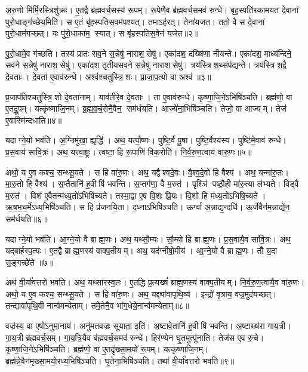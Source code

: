 अ॒रु॒णो मि॑र्मि॒रस्त्रिशु॑क्रः। ए॒तद्वै ब्र॑ह्मवर्च॒सस्य॑ रू॒पम्। रू॒पेणै॒व ब्र॑ह्मवर्च॒समव॑ रुन्धे। बृह॒स्पति॑रकामयत दे॒वानां पुरो॒धाङ्ग॑च्छेय॒मिति॑। स ए॒तं बृ॑हस्पतिस॒वम॑पश्यत्। तमाऽह॑रत्। तेना॑यजत। ततो॒ वै स दे॒वानां पुरो॒धाम॑गच्छत्। यः पु॑रो॒धाका॑म॒ स्यात्। स बृ॑हस्पतिस॒वेन॑ यजेत॥२॥

पु॒रो॒धामे॒व ग॑च्छति। तस्य॑ प्रातः सव॒ने स॒न्नेषु॑ नाराश॒सेषु॑। एका॑दश॒ दख्षि॑णा नीयन्ते। एका॑दश॒ माध्य॑न्दिने॒ सव॑ने स॒न्नेषु॑ नाराश॒सेषु॑। एका॑दश तृतीयसव॒ने स॒न्नेषु॑ नाराश॒सेषु॑। त्रय॑स्त्रिश॒थ्संप॑द्यन्ते। त्रय॑स्त्रिश॒द्वै दे॒वताः। दे॒वता॑ ए॒वाव॑रुन्धे। अश्व॑श्चतुस्त्रि॒शः। प्रा॒जा॒प॒त्यो वा अश्व॑॥३॥

प्र॒जाप॑तिश्चतुस्त्रि॒शो दे॒वता॑नाम्। याव॑तीरे॒व दे॒वताः। ता ए॒वाव॑रुन्धे। कृ॒ष्णा॒जि॒ने॑ऽभिषि॑ञ्चति। ब्रह्म॑णो॒ वा ए॒तद्रू॒पम्। यत्कृ॑ष्णाजि॒नम्। ब्र॒ह्म॒व॒र्च॒सेनै॒वैन॒ सम॑र्धयति। आज्ये॑ना॒भिषि॑ञ्चति। तेजो॒ वा आज्यम्। तेज॑ ए॒वास्मि॑न्दधाति॥४॥\anuvakamend[होता॑ भवति यजेत॒ वा अश्वो॑ दधाति]

यदाग्ने॒यो भव॑ति। अ॒ग्निमु॑खा॒ ह्यृद्धि॑। अथ॒ यत्पौ॒ष्णः। पुष्टि॒र्वै पू॒षा। पुष्टि॒र्वैश्य॑स्य। पुष्टि॑मे॒वाव॑ रुन्धे। प्र॒स॒वाय॑ सावि॒त्रः। अथ॒ यत्त्वा॒ष्ट्रः। त्वष्टा॒ हि रू॒पाणि॑ विक॒रोति॑। नि॒र्व॒रु॒ण॒त्वाय॑ वारु॒णः॥५॥

अथो॒ य ए॒व कश्च॒ सन्थ्सू॒यते। स हि वा॑रु॒णः। अथ॒ यद्वैश्वदे॒वः। वै॒श्व॒दे॒वो हि वैश्य॑। अथ॒ यन्मा॑रु॒तः। मा॒रु॒तो हि वैश्य॑। स॒प्तैतानि॑ ह॒वीषि॑ भवन्ति। स॒प्तग॑णा॒ वै म॒रुत॑। पृश्ञि॑ पष्ठौ॒ही मा॑रु॒त्या ल॑भ्यते। विड्वै म॒रुत॑। विश॑ ए॒वैतन्म॑ध्य॒तो॑ऽभिषि॑च्यते। तस्मा॒द्वा ए॒ष वि॒शः प्रि॒यः। वि॒शो हि म॑ध्य॒तो॑ऽभिषि॒च्यते। ऋ॒ष॒भ॒च॒र्मेऽध्य॒भिषि॑ञ्चति। स हि प्र॑जनयि॒ता। द॒ध्नाऽभिषि॑ञ्चति। ऊर्ग्वा अ॒न्नाद्य॒न्दधि॑। ऊ॒र्जैवैन॑म॒न्नाद्ये॑न॒ सम॑र्धयति॥६॥\anuvakamend[वा॒रु॒णो विड्वै म॒रुतो॒ऽष्टौ च॑]

यदाग्ने॒यो भव॑ति। आ॒ग्ने॒यो वै ब्राह्म॒णः। अथ॒ यथ्सौ॒म्यः। सौ॒म्यो हि ब्राह्म॒णः। प्र॒स॒वायै॒व सा॑वि॒त्रः। अथ॒ यद्बा॑र्\mbox{}हस्प॒त्यः। ए॒तद्वै ब्राह्म॒णस्य॑ वाक्प॒तीयम्। अथ॒ यद॑ग्नीषो॒मीय॑। आ॒ग्ने॒यो वै ब्राह्म॒णः। तौ य॒दा स॒ङ्गच्छे॑ते ॥७॥

अथ॑ वी॒र्या॑वत्तरो भवति। अथ॒ यथ्सा॑रस्व॒तः। ए॒तद्धि प्र॒त्यख्षं॑ ब्राह्म॒णस्य॑ वाक्प॒तीयम्। नि॒र्व॒रु॒ण॒त्वायै॒व वा॑रु॒णः। अथो॒ य ए॒व कश्च॒ सन्थ्सू॒यते। स हि वा॑रु॒णः। अथ॒ यद्द्या॑वापृथि॒व्य॑। इन्द्रो॑ वृ॒त्राय॒ वज्र॒मुद॑यच्छत्। तन्द्यावा॑पृथि॒वी नान्व॑मन्येताम्। तमे॒तेनै॒व भा॑ग॒धेये॒नान्व॑मन्येताम्॥८॥

वज्र॑स्य॒ वा ए॒षो॑ऽनुमा॒नाय॑। अनु॑मतवज्रः सूयाता॒ इति॑। अ॒ष्टावे॒तानि॑ ह॒वीषि॑ भवन्ति। अ॒ष्टाख्ष॑रा गाय॒त्री। गा॒य॒त्री ब्र॑ह्मवर्च॒सम्। गा॒य॒त्रि॒यैव ब॑ह्मवर्च॒समव॑ रुन्धे। हिर॑ण्येन घृ॒तमुत्पु॑नाति। तेज॑स ए॒व रु॒चे। कृ॒ष्णा॒जि॒ने॑ऽभिषि॑ञ्चति। ब्रह्म॑णो॒ वा ए॒तदृ॑ख्सा॒मयो॑ रू॒पम्। यत्कृ॑ष्णाजि॒नम्। ब्रह्म॑न्ने॒वैन॑मृख्सा॒मयो॒रध्य॒भिषि॑ञ्चति। घृ॒तेना॒भिषि॑ञ्चति। तथा॑ वी॒र्या॑वत्तरो भवति॥९॥\anuvakamend[स॒ङ्गच्छे॑ते भाग॒धेये॒नान्व॑मन्येता रू॒पञ्च॒त्वारि॑ च]

